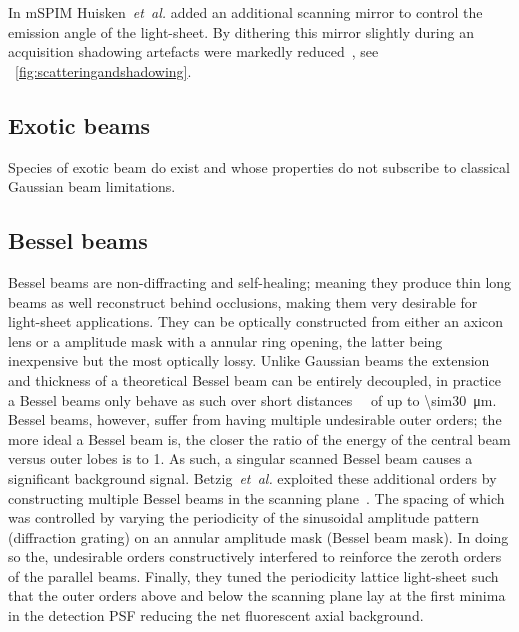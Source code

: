 In \gls{mSPIM} Huisken~\emph{et~al.} added an additional scanning mirror to control the emission angle of the \gls{light-sheet}.
By dithering this mirror slightly during an acquisition shadowing artefacts were markedly reduced~\cite{huiskenEvenFluorescenceExcitation2007b}, see \figurename~\ref{fig:scatteringandshadowing}.

\subsection{Exotic beams}

Species of \gls{exotic beam} do exist and whose properties do not subscribe to classical \gls{Gaussian beam} limitations.
\subsection{Bessel beams}

\gls{Bessel beam}s are non-diffracting and self-healing; meaning they produce thin long beams as well reconstruct behind occlusions, making them very desirable for light-sheet applications.
They can be optically constructed from either an \gls{axicon} lens or a amplitude mask with a annular ring opening, the latter being inexpensive but the most optically lossy.
Unlike Gaussian beams the extension and thickness of a theoretical \gls{Bessel beam} can be entirely decoupled, in practice a \gls{Bessel beam}s only behave as such over short distances~~\cite{gao_3d_2014} of up to \SI{\sim30}{\micro\meter}.
\gls{Bessel beam}s, however, suffer from having multiple undesirable outer orders; the more ideal a \gls{Bessel beam} is, the closer the ratio of the energy of the central beam versus outer lobes is to \SI{1}{}.
As such, a singular scanned \gls{Bessel beam} causes a significant background signal.
Betzig~\emph{et~al.} exploited these additional orders by constructing multiple \gls{Bessel beam}s in the scanning plane~\cite{chen_lattice_2014}.
The spacing of which was controlled by varying the periodicity of the
sinusoidal amplitude pattern (diffraction grating) on an annular amplitude mask (\gls{Bessel beam} mask).
In doing so the, undesirable orders constructively interfered to reinforce the zeroth orders of the parallel beams.
Finally, they tuned the periodicity \gls{lattice light-sheet} such that the outer orders above and below the scanning plane lay at the first minima in the detection \gls{PSF} reducing the net fluorescent axial background.

